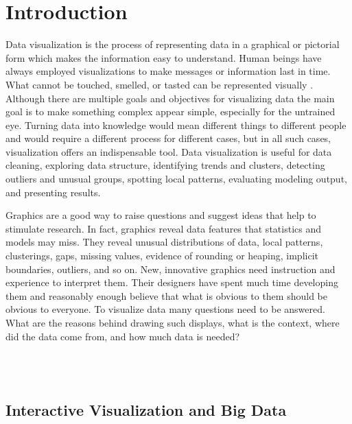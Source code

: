\section{Introduction}

Data visualization is the process of representing data in a graphical or pictorial form which makes the information easy to understand.  Human beings have always employed visualizations to make messages or information last in time. What cannot be touched, smelled, or tasted can be represented visually \cite{sancho2014approach}.
Although there are multiple goals and objectives for visualizing data the main goal is to make something complex appear simple, especially for the untrained eye. Turning data into knowledge would mean different things to different people and would require a different process for different cases, but in all such cases, visualization offers an indispensable tool. Data visualization is useful for data cleaning, exploring data structure, identifying trends and clusters, detecting outliers and unusual groups, spotting local patterns, evaluating modeling output, and presenting results.

Graphics are a good way to raise questions and suggest ideas that help to stimulate research.
In fact, graphics reveal data features that statistics and models may miss. They reveal unusual distributions of data, local patterns, clusterings, gaps, missing values, evidence of rounding or heaping, implicit boundaries, outliers, and so on.  New, innovative graphics need instruction and experience to interpret them. Their designers have spent much time developing them and reasonably enough believe that what is obvious to them should be obvious to everyone.  To visualize data many questions need to be answered. What are the reasons behind drawing such displays, what is the context, where did the data come from, and how much data is needed? 


 
 \\\

\subsection{Interactive Visualization and Big Data}

